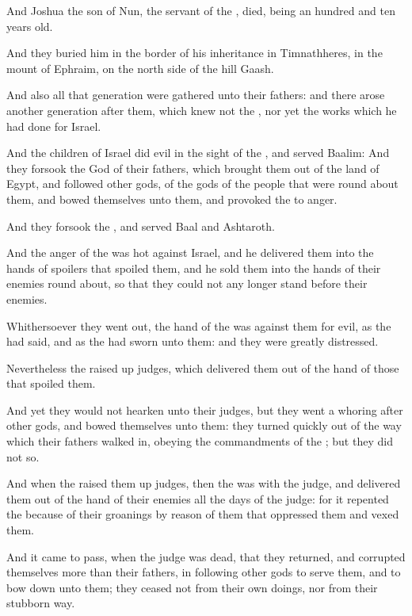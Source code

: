 \verse And Joshua the son of Nun, the servant of the \LORD, died, being an hundred and ten years old.

\verse And they buried him in the border of his inheritance in Timnathheres, in the mount of Ephraim, on the north side of the hill Gaash.

\verse And also all that generation were gathered unto their fathers: and there arose another generation after them, which knew not the \LORD, nor yet the works which he had done for Israel.

\verse And the children of Israel did evil in the sight of the \LORD, and served Baalim: \verse And they forsook the \LORD God of their fathers, which brought them out of the land of Egypt, and followed other gods, of the gods of the people that were round about them, and bowed themselves unto them, and provoked the \LORD to anger.

\verse And they forsook the \LORD, and served Baal and Ashtaroth.

\verse And the anger of the \LORD was hot against Israel, and he delivered them into the hands of spoilers that spoiled them, and he sold them into the hands of their enemies round about, so that they could not any longer stand before their enemies.

\verse Whithersoever they went out, the hand of the \LORD was against them for evil, as the \LORD had said, and as the \LORD had sworn unto them: and they were greatly distressed.

\verse Nevertheless the \LORD raised up judges, which delivered them out of the hand of those that spoiled them.

\verse And yet they would not hearken unto their judges, but they went a whoring after other gods, and bowed themselves unto them: they turned quickly out of the way which their fathers walked in, obeying the commandments of the \LORD; but they did not so.

\verse And when the \LORD raised them up judges, then the \LORD was with the judge, and delivered them out of the hand of their enemies all the days of the judge: for it repented the \LORD because of their groanings by reason of them that oppressed them and vexed them.

\verse And it came to pass, when the judge was dead, that they returned, and corrupted themselves more than their fathers, in following other gods to serve them, and to bow down unto them; they ceased not from their own doings, nor from their stubborn way.

